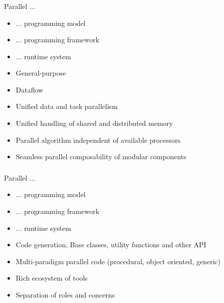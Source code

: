 \begin{frame}[t]
\frametitle{\charm}
\framesubtitle{}
	\begin{block}{Parallel ...}
		\begin{itemize}[<+->]
		\item \alert<4->{... programming model}
		\item ... programming framework
		\item ... runtime system
	\end{itemize}
	\end{block}
    \begin{itemize}[<+->]
        \item General-purpose
        \item Dataflow
        \item Unified data and task parallelism
        \item Unified handling of shared and distributed memory
        \item Parallel algorithm independent of available processors
        \item Seamless parallel composability of modular components
    \end{itemize}
\end{frame}


\begin{frame}[t]
\frametitle{\charm}
\framesubtitle{}
	\begin{block}{Parallel ...}
		\begin{itemize}
		\item ... programming model
		\item \alert{... programming framework}
		\item ... runtime system
	\end{itemize}
	\end{block}
    \begin{itemize}[<+->]
        \item Code generation, Base classes, utility functions and other API
        \item Multi-paradigm parallel code (procedural, object oriented, generic)
        \item Rich ecosystem of tools
        \item Separation of roles and concerns
    \end{itemize}
\end{frame}


